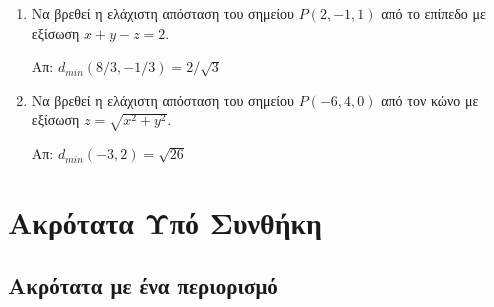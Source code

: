 \documentclass[a4paper,table]{report}
\begin{document}
\begin{enumerate}
  \item Να βρεθεί η ελάχιστη απόσταση του σημείου $ P(2,-1,1) $ από το επίπεδο με 
    εξίσωση $ x+y-z=2 $. 
    
    \hfill Απ: $ d_{min}(8/3,-1/3) = 2 /\sqrt{3} $ 

  \item Να βρεθεί η ελάχιστη απόσταση του σημείου $ P(-6,4,0) $ από τον κώνο με 
    εξίσωση $ z = \sqrt{x^{2}+y^{2}} $. 
    
    \hfill Απ: $ d_{min}(-3,2) = \sqrt{26} $ 

\end{enumerate}


\section*{Ακρότατα Υπό Συνθήκη}

\subsection*{Ακρότατα με ένα περιορισμό}
\end{document}

